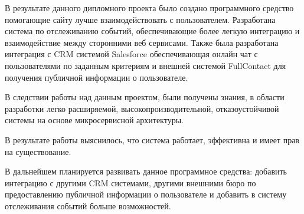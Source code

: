 
В результате данного дипломного проекта было создано программного средство помогающие сайту лучше взаимодействовать с пользователем. Разработана система по отслеживанию событий, обеспечивающие более легкую интеграцию и взаимодействие между сторонними веб сервисами. Также была разработана интеграция с CRM системой Salesforce обеспечивающая онлайн чат с пользователями по заданным критериям и внешней системой FullContact для получения публичной информации о пользователе. 

В следствии работы над данным проектом, были получены знания, в области разработки легко расширяемой, высокопроизводительной, отказоустойчивой системы на основе микросервисной архитектуры.

В результате работы выяснилось, что система работает, эффективна и имеет прав на существование.

В дальнейшем планируется развивать данное программное средства: добавить интеграцию с другими CRM системами, другими внешними бюро по предоставлению публичной информации о пользователе и добавить в систему отслеживания событий больше возможностей.
